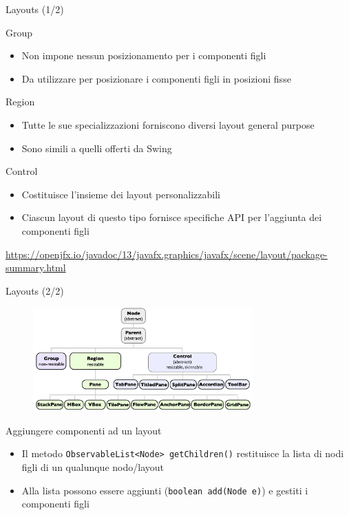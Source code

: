 \documentclass[presentation]{beamer}
\begin{document}
\begin{frame}{Layouts (1/2)}
\begin{block}{Group}
\begin{itemize}
\item Non impone nessun posizionamento per i componenti figli
\item Da utilizzare per posizionare i componenti figli in posizioni fisse
\end{itemize}
\end{block}

\begin{block}{Region}
\begin{itemize}
\item Tutte le sue specializzazioni forniscono diversi layout general purpose
\item Sono simili a quelli offerti da Swing
\end{itemize}
\end{block}

\begin{block}{Control}
\begin{itemize}
\item Costituisce l'insieme dei layout personalizzabili
\item Ciascun layout di questo tipo fornisce specifiche API per l'aggiunta dei componenti figli
\end{itemize}
\end{block}
\url{https://openjfx.io/javadoc/13/javafx.graphics/javafx/scene/layout/package-summary.html}
\end{frame}

\begin{frame}{Layouts (2/2)}
\begin{figure}
\includegraphics[width=0.75\textwidth]{img/layouts.png}
\end{figure}

\begin{block}{Aggiungere componenti ad un layout}
\begin{itemize}
\item Il metodo \texttt{ObservableList<Node> getChildren()} restituisce la lista di nodi figli di un qualunque nodo/layout
\item Alla lista possono essere aggiunti (\texttt{boolean add(Node e)}) e gestiti i componenti figli
\end{itemize}
\end{block}
\end{frame}
\end{document}
